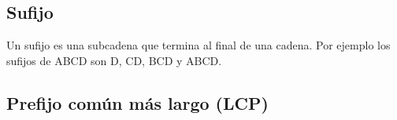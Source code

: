 \subsection{Sufijo}
Un sufijo es una subcadena que termina al final de una cadena. Por ejemplo los sufijos de ABCD son D, CD, BCD y ABCD.

\subsection{Prefijo común más largo (LCP)}